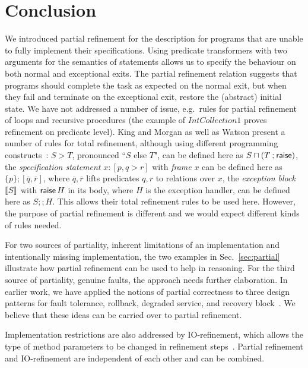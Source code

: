 \documentclass[submission,copyright,creativecommons]{eptcs}
\newcommand{\KW}[1]{\mathop{\sf #1}}
\newcommand{\RAISE}{\KW{raise}}
\newcommand{\semi}{\mathbin{;}}
\newcommand{\meet}{\sqcap}
\newcommand{\SEMI}{\mathbin{;\!;}}
\begin{document}
\section{Conclusion}
\label{sec:conclusion}



We introduced partial refinement for the description for programs that are unable to fully implement their specifications. Using predicate transformers with two arguments for the semantics of statements allows us to specify the behaviour on both normal and exceptional exits. The partial refinement relation suggests that programs should complete the task as expected on the normal exit, but when they fail and terminate on the exceptional exit, restore the (abstract) initial state. We have not addressed a number of issue, e.g.~rules for partial refinement of loops and recursive procedures (the example of $IntCollection1$ proves refinement on predicate level). King and Morgan as well as Watson present a number of rules for total refinement, although using different programming constructs~\cite{KingMorgan95ExitsInRefinementCalculus,Watson02RefiningExceptions}: $S > T$, pronounced ``$S$ else $T$", can be defined here as $S \meet (T \semi \RAISE)$, the \emph{specification statement} $x:[p, q > r]$ with \emph{frame} $x$ can be defined here as $\{p\} \semi [\overline{q}, \overline{r}]$, where $\overline{q}, \overline{r}$ lifts predicates $q, r$ to relations over $x$, the \emph{exception block} $[\hspace{-.15em}[S]\hspace{-.15em}]$ with $\RAISE H$ in its body, where $H$ is the exception handler, can be defined here as $S \SEMI H$. This allows their total refinement rules to be used here. However, the purpose of partial refinement is different and we would expect different kinds of rules needed.

For two sources of partiality, inherent limitations of an implementation and intentionally missing implementation, the two examples in Sec.~\ref{sec:partial} illustrate how partial refinement can be used to help in reasoning. For the third source of partiality, genuine faults, the approach needs further elaboration. In earlier work, we have applied the notions of partial correctness to three design patterns for fault tolerance, rollback, degraded service, and recovery block~\cite{SekerinskiZhang11PartialCorrectness}. We believe that these ideas can be carried over to partial refinement.

Implementation restrictions are also addressed by IO-refinement, which allows the type of method parameters to be changed in refinement steps~\cite{BoitenDerrick98IORefinement, BanachaPoppletonJeskeaStepney07Retrenchment, DerrickBoiten01RefinementZObjectZ, MikhajlovaSekerinski97ClassInterfaceRefinement, StepneyCooperWoodcock98ZDataRefinement}. Partial refinement and IO-refinement are independent of each other and can be combined.
\end{document}
